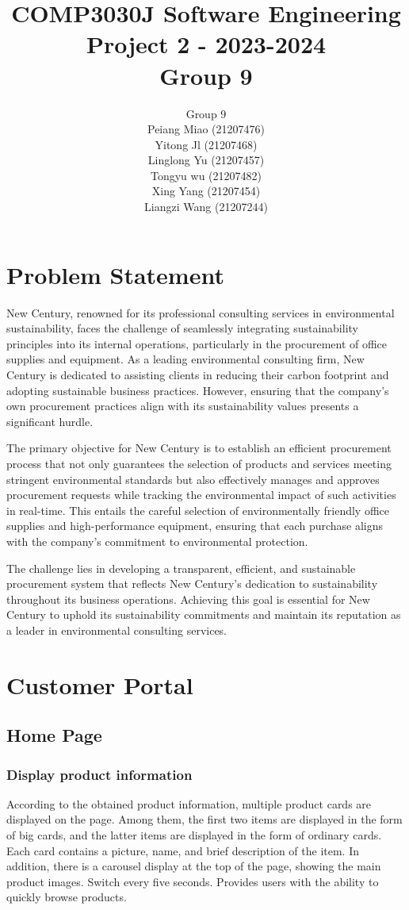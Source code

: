 \documentclass{article}
\title{COMP3030J Software Engineering Project 2 - 2023-2024 \\ Group 9}
\author{Group 9\\
Peiang Miao (21207476)\\
Yitong Jl (21207468)\\
Linglong Yu (21207457)\\
Tongyu wu (21207482)\\
Xing Yang (21207454)\\
Liangzi Wang (21207244)}
\date{}
\begin{document}
\maketitle
{}
\tableofcontents
\newpage
{}

\section{Problem Statement}
New Century, renowned for its professional consulting services in environmental sustainability, faces the challenge of seamlessly integrating sustainability principles into its internal operations, particularly in the procurement of office supplies and equipment. As a leading environmental consulting firm, New Century is dedicated to assisting clients in reducing their carbon footprint and adopting sustainable business practices. However, ensuring that the company's own procurement practices align with its sustainability values presents a significant hurdle.

The primary objective for New Century is to establish an efficient procurement process that not only guarantees the selection of products and services meeting stringent environmental standards but also effectively manages and approves procurement requests while tracking the environmental impact of such activities in real-time. This entails the careful selection of environmentally friendly office supplies and high-performance equipment, ensuring that each purchase aligns with the company's commitment to environmental protection.

The challenge lies in developing a transparent, efficient, and sustainable procurement system that reflects New Century's dedication to sustainability throughout its business operations. Achieving this goal is essential for New Century to uphold its sustainability commitments and maintain its reputation as a leader in environmental consulting services.

\section{Customer Portal}
\subsection{Home Page}
\subsubsection{Display product information}
According to the obtained product information, multiple product cards are displayed on the page. Among them, the first two items are displayed in the form of big cards, and the latter items are displayed in the form of ordinary cards. Each card contains a picture, name, and brief description of the item. In addition, there is a carousel display at the top of the page, showing the main product images. Switch every five seconds. Provides users with the ability to quickly browse products.
\end{document}
